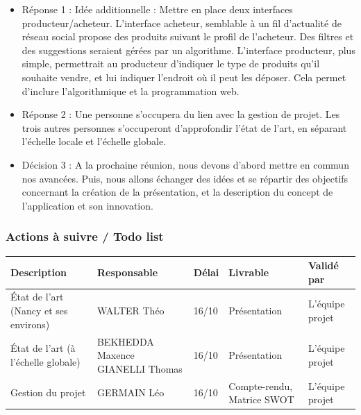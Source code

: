 \documentclass[11pt]{article}
\begin{document}
\begin{itemize}
	\item 

	Réponse 1 : Idée additionnelle : Mettre en place deux interfaces producteur/acheteur. L’interface acheteur, semblable à un fil d’actualité de réseau social propose des produits suivant le profil de l’acheteur. Des filtres et des suggestions seraient gérées par un algorithme. L’interface producteur, plus simple, permettrait au producteur d’indiquer le type de produits qu’il souhaite vendre, et lui indiquer l’endroit où il peut les déposer. Cela permet d’inclure l’algorithmique et la programmation web.

\item	Réponse 2 : Une personne s’occupera du lien avec la gestion de projet. Les trois autres personnes s’occuperont d’approfondir l’état de l’art, en séparant l’échelle locale et l’échelle globale.
\item	Décision 3 : A la prochaine réunion, nous devons d’abord mettre en commun nos avancées. Puis, nous allons échanger des idées et se répartir des objectifs concernant la création de la présentation, et la description du concept de l’application et son innovation.

\end{itemize}
\vspace{0.5cm}

\subsubsection{Actions à suivre / Todo list}
\vspace{0.2cm}

\begin{center}
\begin{tabular}{|p{4cm}|p{4cm}|p{1cm}|p{3cm}|p{2cm}|}
\hline
\centering Description & 
\centering Responsable & 
\centering Délai & 
\centering Livrable & 
\hspace{0.05cm} Validé par\\
\hline
État de l'art (Nancy et ses environs) & WALTER Théo & 16/10 & Présentation & L'équipe projet \\
\hline
État de l'art (à l'échelle globale) & BEKHEDDA Maxence GIANELLI Thomas & 16/10 & Présentation & L'équipe projet\\
\hline
Gestion du projet & GERMAIN Léo & 16/10 & Compte-rendu, Matrice SWOT & L'équipe projet \\
\hline
	
\end{tabular}
\end{center}
\end{document}
